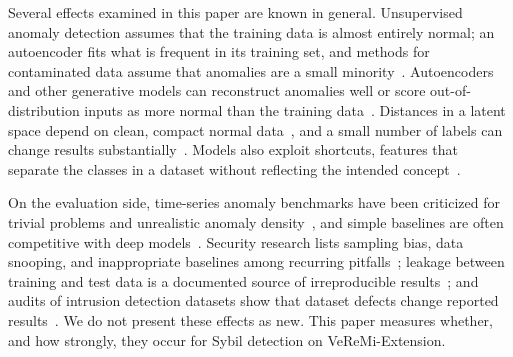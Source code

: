 Several effects examined in this paper are known in general. Unsupervised anomaly detection assumes that the
training data is almost entirely normal; an autoencoder fits what is frequent in its training set, and methods for
contaminated data assume that anomalies are a small
minority~\cite{ruff2021unifying,pang2021deep,zhou2017anomaly,qiu2022latent}. Autoencoders and other generative
models can reconstruct anomalies well or score out-of-distribution inputs as more normal than the training
data~\cite{gong2019memorizing,yoon2021autoencoding,nalisnick2019deep,kirichenko2020normalizing,wang2019location}. Distances in a
latent space depend on clean, compact normal data~\cite{ruff2018deep,denouden2018improving}, and a small number of
labels can change results substantially~\cite{ruff2020deep,ruff2021rethinking,han2022adbench}. Models also exploit
shortcuts, features that separate the classes in a dataset without reflecting the intended
concept~\cite{geirhos2020shortcut,jacobs2022ai}.

On the evaluation side, time-series anomaly benchmarks have been criticized for trivial problems and unrealistic
anomaly density~\cite{wu2021current}, and simple baselines are often competitive with deep
models~\cite{kim2022rigorous,audibert2022deep,sarfraz2024position,schmidl2022anomaly}. Security research lists
sampling bias, data snooping, and inappropriate baselines among recurring
pitfalls~\cite{arp2022dos,sommer2010outside,pendlebury2019tesseract,apruzzese2023sok}; leakage between training
and test data is a documented source of irreproducible results~\cite{kapoor2023leakage}; and audits of intrusion
detection datasets show that dataset defects change reported
results~\cite{engelen2021troubleshooting,liu2022error,flood2024bad}. We do not present these effects as new. This
paper measures whether, and how strongly, they occur for Sybil detection on VeReMi-Extension.
